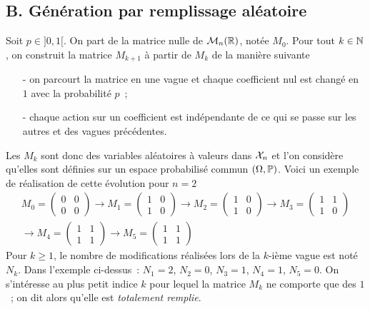 \subsection*{B. G\'en\'eration par remplissage al\'eatoire}
Soit $p\in ]0,1[$. On part de la matrice nulle de ${\cal M}_n(\mathbb{R})$, not\'ee $M_0$. Pour tout $k\in \mathbb{N}$, on construit la matrice $M_{k+1}$ \`a partir de $M_k$ de la mani\`ere suivante
\begin{itemize}
\item[-] on parcourt la matrice en une vague et chaque coefficient nul est chang\'e en $1$ avec la probabilit\'e $p$~;
\item[-] chaque action sur un coefficient est ind\'ependante de ce qui se passe sur les autres et des vagues pr\'ec\'edentes.
\end{itemize}
Les $M_k$ sont donc des variables al\'eatoires \`a valeurs dans ${\cal X}_n$ et l'on consid\`ere qu'elles sont d\'efinies sur un espace probabilis\'e commun $(\Omega,\mathbb{P})$. Voici un exemple de r\'ealisation de cette \'evolution pour $n=2$
\begin{multline*}
M_0=\begin{pmatrix}0&0\\0&0\end{pmatrix}\rightarrow
M_1=\begin{pmatrix}1&0\\1&0\end{pmatrix}\rightarrow
M_2=\begin{pmatrix}1&0\\1&0\end{pmatrix}\rightarrow
M_3=\begin{pmatrix}1&1\\1&0\end{pmatrix} \\
\rightarrow  M_4=\begin{pmatrix}1&1\\1&1\end{pmatrix}\rightarrow
M_5=\begin{pmatrix}1&1\\1&1\end{pmatrix}  
\end{multline*}
Pour $k\geq 1$, le nombre de modifications r\'ealis\'ees lors de la $k$-i\`eme vague est not\'e $N_k$. Dans l'exemple ci-dessus~: $N_1=2$, $N_2=0$, $N_3=1$, $N_4=1$, $N_5=0$.\newline
On s'int\'eresse au plus petit indice $k$ pour lequel la matrice $M_k$ ne comporte que des $1$~; on dit alors qu'elle est {\it totalement remplie}.\newline
